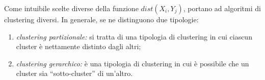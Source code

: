\documentclass{subfiles}
\begin{document}
Come intuibile scelte diverse della funzione $dist\left(X_{i}, Y_{j}\right)$, portano ad algoritmi di clustering diversi.
In generale, se ne distinguono due tipologie:
\begin{enumerate}
    \item \emph{clustering partizionale:} si tratta di una tipologia di clustering in cui ciascun cluster è nettamente distinto dagli altri;
    \item \emph{clustering gerarchico:} è una tipologia di clustering in cui è possibile che un cluster sia ``sotto-cluster'' di un'altro.
\end{enumerate}
\end{document}
